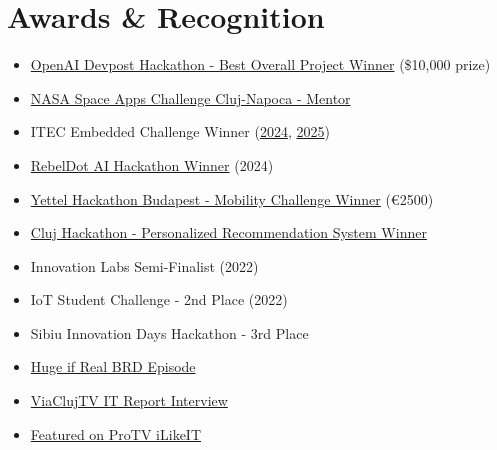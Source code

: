 \documentclass[11pt,a4paper]{article}
\begin{document}
\section*{Awards \& Recognition}
\begin{itemize}[noitemsep]
    \item \href{https://openai.devpost.com/updates/37529-and-the-winners-are}{OpenAI Devpost Hackathon - Best Overall Project Winner} (\$10,000 prize)
    \item \href{https://www.nasa.gov/nasa-space-apps-challenge-2025/}{NASA Space Apps Challenge Cluj-Napoca - Mentor}
    \item ITEC Embedded Challenge Winner (\href{https://www.linkedin.com/posts/voic-andrei-622781212_thrilled-to-share-my-journey-at-the-itec-activity-7184195765492137984-8Hpx?utm_source=share&utm_medium=member_desktop&rcm=ACoAADXdBjoBOBq0ceefiKkSdziS2fVyDUrVgb8}{2024}, \href{https://www.linkedin.com/posts/voic-andrei-622781212_happy-to-share-that-diana-nicoleta-trif-and-activity-7315362834945589248-rInK?utm_source=share&utm_medium=member_desktop&rcm=ACoAADXdBjoBOBq0ceefiKkSdziS2fVyDUrVgb8}{2025})
    \item \href{https://www.linkedin.com/posts/voic-andrei-622781212_grateful-to-have-won-the-rebeldot-ai-hackathon-activity-7255285628844580865-EeHx?utm_source=share&utm_medium=member_desktop&rcm=ACoAADXdBjoBOBq0ceefiKkSdziS2fVyDUrVgb8}{RebelDot AI Hackathon Winner} (2024)
    \item \href{https://www.linkedin.com/posts/voic-andrei-622781212_last-week-our-team-qualified-amongst-the-activity-7000827398745145344-2u9W?utm_source=share&utm_medium=member_desktop&rcm=ACoAADXdBjoBOBq0ceefiKkSdziS2fVyDUrVgb8}{Yettel Hackathon Budapest - Mobility Challenge Winner} (€2500)
    \item \href{https://www.linkedin.com/posts/voic-andrei-622781212_clujhackathon-chatgpt-clujnapoca-activity-7081524132185522176-mtwa?utm_source=share&utm_medium=member_desktop&rcm=ACoAADXdBjoBOBq0ceefiKkSdziS2fVyDUrVgb8}{Cluj Hackathon - Personalized Recommendation System Winner}
    \item Innovation Labs Semi-Finalist (2022)
    \item IoT Student Challenge - 2nd Place (2022)
    \item Sibiu Innovation Days Hackathon - 3rd Place
    \item \href{https://www.youtube.com/watch?v=GgeAACTfDI0}{Huge if Real BRD Episode}
    \item \href{https://www.youtube.com/watch?v=C1V9CzapsNY&t=2s}{ViaClujTV IT Report Interview}
    \item \href{https://stirileprotv.ro/stiri/ilikeit/ilikeit-proiect-al-unor-studenti-din-cluj-dotarea-serviciilor-medicale-de-urgenta-cu-drone.html}{Featured on ProTV iLikeIT}
\end{itemize}
\end{document}
